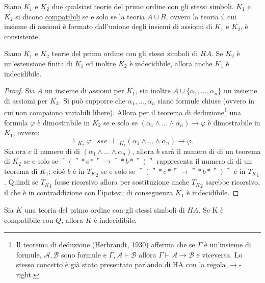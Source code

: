 \begin{defi}
Siano $K_1$ e $K_2$ due qualsiasi teorie del primo ordine con gli stessi simboli.
 $K_1$ e $K_2$ si dicono \underline{compatibili} se e solo se la teoria $A \cup B$,
 ovvero la teoria il cui insieme di assiomi è formato dall'unione degli insiemi di assiomi di $K_1$ e $K_2$, 
è consistente.
\end{defi}

\begin{prop}
\label{p111}
 Siano $K_1$ e $K_2$ teorie del primo ordine con gli stessi simboli di $HA$.
Se $K_2$ è un'estensione finita di $K_1$ ed inoltre $K_2$ è indecidibile, allora anche $K_1$ è indecidibile.
\end{prop}

\begin{proof} 
Sia $A$ un insieme di assiomi per $K_1$, sia inoltre $A \cup \{ \alpha_1,...,\alpha_n \}$ un insieme
di assiomi per $K_2$. Si può supporre che $ \alpha_1,...,\alpha_n $ siano formule chiuse (ovvero
in cui non compaiono variabili libere). \newline
Allora per il teorema di deduzione\footnote{ Il teorema di deduzione (Herbrandt, 1930) afferma che
se $\Gamma$ è un'insieme di formule, $\mathcal{A},\mathcal{B}$ sono formule e $\Gamma,\mathcal{A} \vdash \mathcal{B}$
allora $\Gamma \vdash \mathcal{A} \rightarrow \mathcal{B}$ e viceversa. Lo stesso concetto è già stato presentato
parlando di HA con la regola $\rightarrow$-right.} 
una formula $\varphi$ è dimostrabile in $K_2$ se e solo se
$(\alpha_1\wedge...\wedge\alpha_n) \rightarrow \varphi $ è dimostrabile in $K_1$, ovvero:
$$ \vdash _{K_{2}} \varphi \;\;\; sse \;\; \vdash \!\! _{K_{1}} (\alpha_1\wedge...\wedge\alpha_n) \rightarrow \varphi. $$
Sia ora $c$ il numero di \godel di $(\alpha_1\wedge...\wedge\alpha_n)$, allora $b$ sarà il numero di \godel di un teorema di $K_2$ se e solo se
$ \ulcorner ( \urcorner * c * \ulcorner \rightarrow \urcorner * b * \ulcorner ) \urcorner $ rappresenta il numero di \godel 
di un teorema di $K_1$; cioè $b$ è in ${T_K}_2$ se e solo se
 $ \ulcorner ( \urcorner * c * \ulcorner \rightarrow \urcorner * b * \ulcorner ) \urcorner $ è in ${T_K}_1$. \newline
Quindi se ${T_K}_1$ fosse ricorsivo allora per sostituzione anche ${T_K}_2$ sarebbe ricorsivo, il che è in contraddizione con
l'ipotesi; di conseguenza $K_1$ è indecidibile.
\end{proof}

\begin{prop}
\label{p112}
Sia $K$ una teoria del primo ordine con gli stessi simboli di $HA$. Se K è compatibile con $Q$,
 allora $K$ è indecidibile. 
\end{prop}

